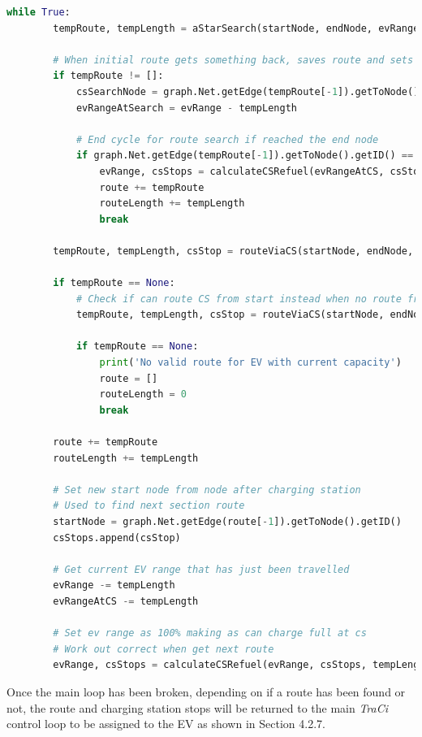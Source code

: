 \documentclass[11pt]{report}
\begin{document}
\begin{lstlisting}[language=Python, caption=Main iterator loop for routing solution, label={lst:6}]
    while True:
        tempRoute, tempLength = aStarSearch(startNode, endNode, evRange, False)

        # When initial route gets something back, saves route and sets new start as last node
        if tempRoute != []:
            csSearchNode = graph.Net.getEdge(tempRoute[-1]).getToNode().getID()
            evRangeAtSearch = evRange - tempLength

            # End cycle for route search if reached the end node
            if graph.Net.getEdge(tempRoute[-1]).getToNode().getID() == endNode:
                evRange, csStops = calculateCSRefuel(evRangeAtCS, csStops, tempLength, 10)
                route += tempRoute
                routeLength += tempLength
                break

        tempRoute, tempLength, csStop = routeViaCS(startNode, endNode, evRangeAtSearch, csSearchNode, evRange, hyperParams)

        if tempRoute == None:
            # Check if can route CS from start instead when no route from start node
            tempRoute, tempLength, csStop = routeViaCS(startNode, endNode, evRange, startNode, evRange, weightings)

            if tempRoute == None:
                print('No valid route for EV with current capacity')
                route = []
                routeLength = 0
                break

        route += tempRoute
        routeLength += tempLength

        # Set new start node from node after charging station
        # Used to find next section route
        startNode = graph.Net.getEdge(route[-1]).getToNode().getID()
        csStops.append(csStop)

        # Get current EV range that has just been travelled
        evRange -= tempLength
        evRangeAtCS -= tempLength

        # Set ev range as 100% making as can charge full at cs
        # Work out correct when get next route
        evRange, csStops = calculateCSRefuel(evRange, csStops, tempLength, 100)

\end{lstlisting}

Once the main loop has been broken, depending on if a route has been found or not, the route and charging station stops will be returned to the main \emph{TraCi} control loop to be assigned to the EV as shown in Section 4.2.7.
\end{document}
